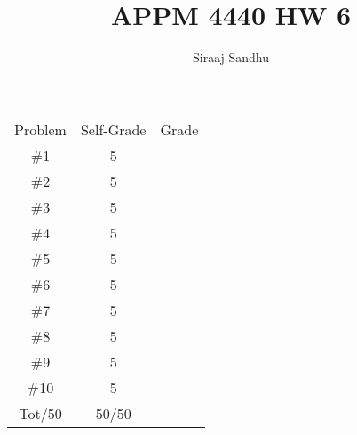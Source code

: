 \documentclass{article}
\title{APPM 4440 HW 6}
\author{Siraaj Sandhu}
\begin{document}
\maketitle
\color{Red}
\begin{center}
\begin{tabular}{|c|c|c|}
  Problem & Self-Grade & Grade \\
  \#1 & 5 & \\
  \#2 & 5 & \\
  \#3 & 5 & \\
  \#4 & 5 & \\
  \#5 & 5 & \\
  \#6 & 5 & \\
  \#7 & 5 & \\
  \#8 & 5 & \\
  \#9 & 5 & \\
  \#10 & 5 & \\
  Tot/50 & 50/50 & \\
\end{tabular}
\end{center}
\color{Black}
\end{document}
